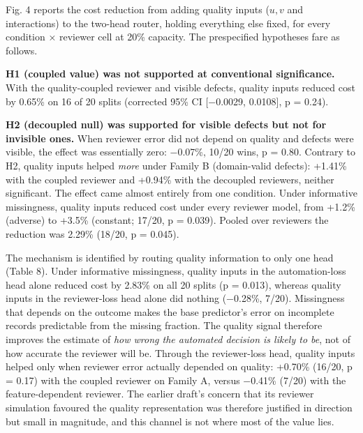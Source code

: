 \documentclass[
  11pt,
]{article}
\begin{document}
Fig. 4 reports the cost reduction from adding quality inputs (\(u,v\)
and interactions) to the two-head router, holding everything else fixed,
for every condition × reviewer cell at 20\% capacity. The prespecified
hypotheses fare as follows.

\textbf{H1 (coupled value) was not supported at conventional
significance.} With the quality-coupled reviewer and visible defects,
quality inputs reduced cost by 0.65\% on 16 of 20 splits (corrected 95\%
CI {[}−0.0029, 0.0108{]}, p = 0.24).

\textbf{H2 (decoupled null) was supported for visible defects but not
for invisible ones.} When reviewer error did not depend on quality and
defects were visible, the effect was essentially zero: −0.07\%, 10/20
wins, p = 0.80. Contrary to H2, quality inputs helped \emph{more} under
Family B (domain-valid defects): +1.41\% with the coupled reviewer and
+0.94\% with the decoupled reviewers, neither significant. The effect
came almost entirely from one condition. Under informative missingness,
quality inputs reduced cost under every reviewer model, from +1.2\%
(adverse) to +3.5\% (constant; 17/20, p = 0.039). Pooled over reviewers
the reduction was 2.29\% (18/20, p = 0.045).

The mechanism is identified by routing quality information to only one
head (Table 8). Under informative missingness, quality inputs in the
automation-loss head alone reduced cost by 2.83\% on all 20 splits (p =
0.013), whereas quality inputs in the reviewer-loss head alone did
nothing (−0.28\%, 7/20). Missingness that depends on the outcome makes
the base predictor's error on incomplete records predictable from the
missing fraction. The quality signal therefore improves the estimate of
\emph{how wrong the automated decision is likely to be}, not of how
accurate the reviewer will be. Through the reviewer-loss head, quality
inputs helped only when reviewer error actually depended on quality:
+0.70\% (16/20, p = 0.17) with the coupled reviewer on Family A, versus
−0.41\% (7/20) with the feature-dependent reviewer. The earlier draft's
concern that its reviewer simulation favoured the quality representation
was therefore justified in direction but small in magnitude, and this
channel is not where most of the value lies.
\end{document}
